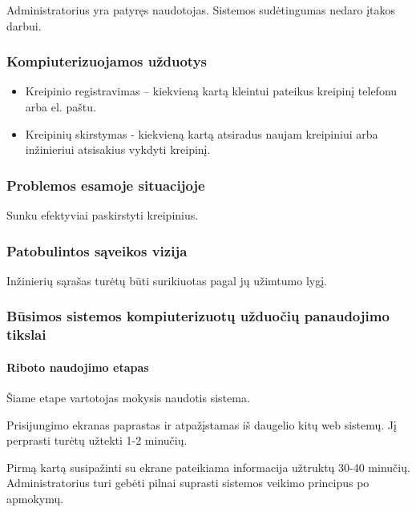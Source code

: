 		Administratorius yra patyręs naudotojas. Sistemos sudėtingumas nedaro įtakos darbui.
		
		\subsubsection{Kompiuterizuojamos užduotys}
		
		\begin{itemize}
			\item Kreipinio registravimas – kiekvieną kartą kleintui pateikus kreipinį telefonu arba el. paštu.
			\item Kreipinių skirstymas - kiekvieną kartą atsiradus naujam kreipiniui arba inžinieriui atsisakius vykdyti kreipinį.
		\end{itemize}
		
		\subsubsection{Problemos esamoje situacijoje}
		
		Sunku efektyviai paskirstyti kreipinius.
		
		\subsubsection{Patobulintos sąveikos vizija}
		
		Inžinierių sąrašas turėtų būti surikiuotas pagal jų užimtumo lygį.
		
		\subsubsection{Būsimos sistemos kompiuterizuotų užduočių panaudojimo tikslai}
		
			\setcounter{tocdepth}{5} \setcounter{secnumdepth}{5}
			
			\paragraph{Riboto naudojimo etapas}
			
			Šiame etape vartotojas mokysis naudotis sistema.
			
			Prisijungimo ekranas paprastas ir atpažįstamas iš daugelio kitų web sistemų.
			Jį perprasti turėtų užtekti 1-2 minučių.

			Pirmą kartą susipažinti su ekrane pateikiama informacija užtruktų 30-40 minučių.
			Administratorius turi gebėti pilnai suprasti sistemos veikimo principus po apmokymų.
			
